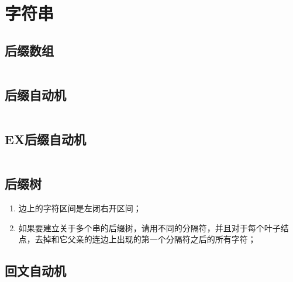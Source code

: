 \chapter{字符串}
\section{后缀数组}
\inputminted{cpp}{\source/string/suffix-array.cpp}
\section{后缀自动机}
\inputminted{cpp}{\source/string/suffix-automaton.cpp}
\section{EX后缀自动机}
\inputminted{cpp}{\source/string/ex-suffix-automaton.cpp}
\section{后缀树}
\begin{enumerate}
	\item 边上的字符区间是左闭右开区间；
	\item 如果要建立关于多个串的后缀树，请用不同的分隔符，并且对于每个叶子结点，去掉和它父亲的连边上出现的第一个分隔符之后的所有字符；
\end{enumerate}
\section{回文自动机}
\inputminted{cpp}{\source/string/palindromic-tree.cpp}
